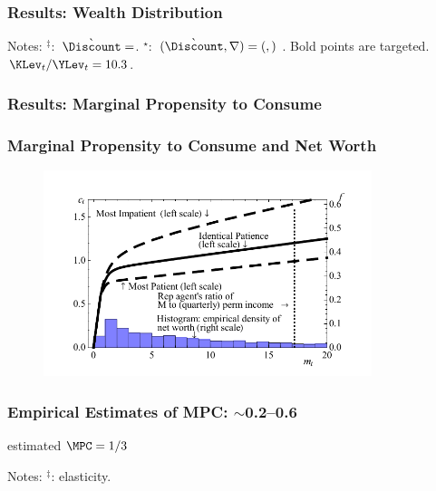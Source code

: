 \documentclass{beamer}
\begin{document}
\begin{frame}
\frametitle{{Results: Wealth Distribution}}

\begin{table}
\begin{footnotesize}



\end{footnotesize}
\end{table}
\tiny{Notes: $^{\ddagger}:$ $\grave{\Discount}=

$.
$^{\star}:$ $(\grave{\Discount}, \nabla)=(

,

)$%
.
Bold points are targeted. $\KLev_{t}/\YLev_{t}=10.3$. }
\end{frame}

\subsubsection{Results: Marginal Propensity to Consume}

\begin{frame}
\frametitle{{Marginal Propensity to Consume and Net Worth}}

\begin{figure}
\centering
\includegraphics[width=\textwidth,height=6cm]{../Figures/CFuncDistSevenPointPermAndHistNetWorthPlotFedQuarterly.pdf}
\end{figure}

\end{frame}

\begin{frame}
\frametitle{{Empirical Estimates of MPC: $\boldsymbol{\sim}$0.2--0.6}}
\centerline{\cite{friedman:windfalls} estimated $\MPC = 1/3$}

\begin{tiny}

\tiny{Notes: $^{\ddagger}$: elasticity.}
\end{tiny}

\end{frame}
\end{document}
